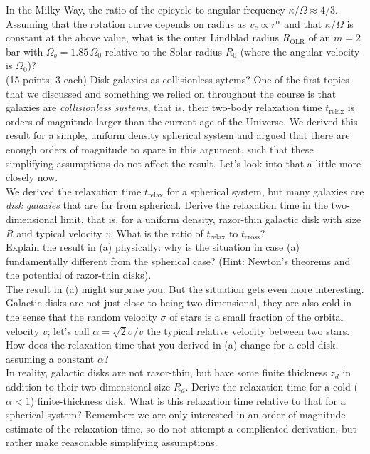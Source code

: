 \documentclass[12pt]{article}
\begin{document}
 In the Milky Way, the ratio of the
epicycle-to-angular frequency $\kappa/\Omega \approx 4/3$. Assuming
that the rotation curve depends on radius as $v_c \propto r^\alpha$
and that $\kappa/\Omega$ is constant at the above value, what is the
outer Lindblad radius $R_\mathrm{OLR}$ of an $m=2$ bar with $\Omega_b
= 1.85\,\Omega_0$ relative to the Solar radius $R_0$ (where the
angular velocity is $\Omega_0$)?\\

 (15 points; 3 each) Disk galaxies as
collisionless sytems? One of the first topics that we discussed and
something we relied on throughout the course is that galaxies are
\emph{collisionless systems}, that is, their two-body relaxation time
$t_\mathrm{relax}$ is orders of magnitude larger than the current age
of the Universe. We derived this result for a simple, uniform density
spherical system and argued that there are enough orders of magnitude
to spare in this argument, such that these simplifying assumptions do
not affect the result. Let's look into that a little more closely
now.\\

 We derived the relaxation time $t_\mathrm{relax}$
for a spherical system, but many galaxies are \emph{disk galaxies}
that are far from spherical. Derive the relaxation time in the
two-dimensional limit, that is, for a uniform density, razor-thin
galactic disk with size $R$ and typical velocity $v$. What is the
ratio of $t_\mathrm{relax}$ to $t_\mathrm{cross}$?\\

 Explain the result in (a) physically: why is the
situation in case (a) fundamentally different from the spherical case?
(Hint: Newton's theorems and the potential of razor-thin disks).\\

 The result in (a) might surprise you. But the
situation gets even more interesting. Galactic disks are not just
close to being two dimensional, they are also cold in the sense that
the random velocity $\sigma$ of stars is a small fraction of the
orbital velocity $v$; let's call $\alpha = \sqrt{2}\sigma/v$ the
typical relative velocity between two stars. How does the relaxation
time that you derived in (a) change for a cold disk, assuming a
constant $\alpha$?\\

 In reality, galactic disks are not razor-thin, but
have some finite thickness $z_d$ in addition to their two-dimensional
size $R_d$. Derive the relaxation time for a cold ($\alpha < 1$)
finite-thickness disk. What is this relaxation time relative to that
for a spherical system? Remember: we are only interested in an
order-of-magnitude estimate of the relaxation time, so do not attempt
a complicated derivation, but rather make reasonable simplifying
assumptions.\\
\end{document}
